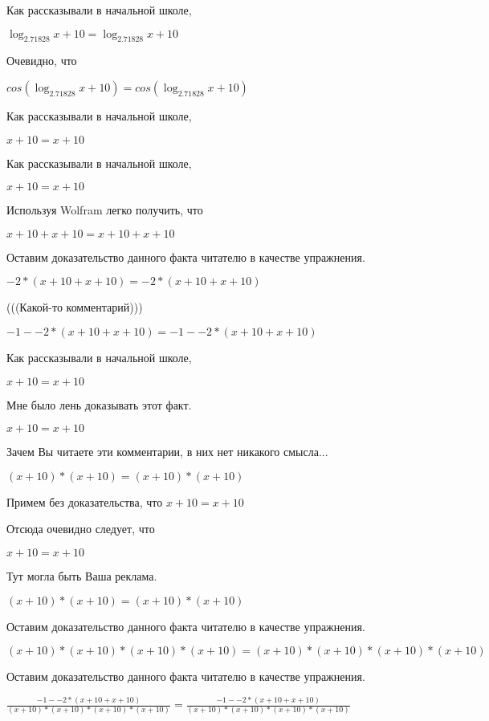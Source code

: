 \documentclass[12pt,a4paper,fleqn]{article}
\theoremstyle{definition}
\begin{document}
Как рассказывали в начальной школе,

$\log_{ 2.71828 }{ x  +  10 } = \log_{ 2.71828 }{ x  +  10 }$

Очевидно, что

$cos(\log_{ 2.71828 }{ x  +  10 }) = cos(\log_{ 2.71828 }{ x  +  10 })$

Как рассказывали в начальной школе,

$ x  +  10  =  x  +  10 $

Как рассказывали в начальной школе,

$ x  +  10  =  x  +  10 $

Используя Wolfram легко получить, что

$ x  +  10  +  x  +  10  =  x  +  10  +  x  +  10 $

Оставим доказательство данного факта читателю в качестве упражнения.

$ -2  * ( x  +  10  +  x  +  10 ) =  -2  * ( x  +  10  +  x  +  10 )$

(((Какой-то комментарий)))

$ -1  -  -2  * ( x  +  10  +  x  +  10 ) =  -1  -  -2  * ( x  +  10  +  x  +  10 )$

Как рассказывали в начальной школе,

$ x  +  10  =  x  +  10 $

Мне было лень доказывать этот факт.

$ x  +  10  =  x  +  10 $

Зачем Вы читаете эти комментарии, в них нет никакого смысла...

$( x  +  10 ) * ( x  +  10 ) = ( x  +  10 ) * ( x  +  10 )$

Примем без доказательства, что
$ x  +  10  =  x  +  10 $

Отсюда очевидно следует, что

$ x  +  10  =  x  +  10 $

Тут могла быть Ваша реклама.

$( x  +  10 ) * ( x  +  10 ) = ( x  +  10 ) * ( x  +  10 )$

Оставим доказательство данного факта читателю в качестве упражнения.

$( x  +  10 ) * ( x  +  10 ) * ( x  +  10 ) * ( x  +  10 ) = ( x  +  10 ) * ( x  +  10 ) * ( x  +  10 ) * ( x  +  10 )$

Оставим доказательство данного факта читателю в качестве упражнения.

$\frac{ -1  -  -2  * ( x  +  10  +  x  +  10 )}{( x  +  10 ) * ( x  +  10 ) * ( x  +  10 ) * ( x  +  10 )}
 = \frac{ -1  -  -2  * ( x  +  10  +  x  +  10 )}{( x  +  10 ) * ( x  +  10 ) * ( x  +  10 ) * ( x  +  10 )}
$
\end{document}
